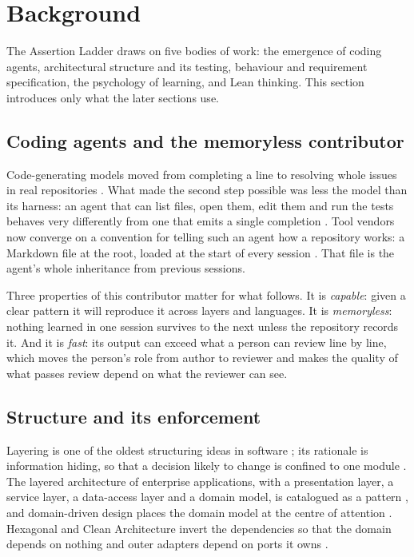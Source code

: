 \section{Background}\label{sec:background}

The Assertion Ladder draws on five bodies of work: the emergence of coding agents, architectural
structure and its testing, behaviour and requirement specification, the psychology of learning,
and Lean thinking. This section introduces only what the later sections use.

\subsection{Coding agents and the memoryless contributor}

Code-generating models moved from completing a line \citep{chen2021codex} to resolving whole
issues in real repositories \citep{jimenez2024swebench}. What made the second step possible was
less the model than its harness: an agent that can list files, open them, edit them and run the
tests behaves very differently from one that emits a single completion
\citep{yang2024sweagent}. Tool vendors now converge on a convention for telling such an agent
how a repository works: a Markdown file at the root, loaded at the start of every session
\citep{agentsmd}. That file is the agent's whole inheritance from previous sessions.

Three properties of this contributor matter for what follows. It is \emph{capable}: given a
clear pattern it will reproduce it across layers and languages. It is \emph{memoryless}: nothing
learned in one session survives to the next unless the repository records it. And it is
\emph{fast}: its output can exceed what a person can review line by line, which moves the
person's role from author to reviewer \citep{barke2023grounded} and makes the quality of what
passes review depend on what the reviewer can see.

\subsection{Structure and its enforcement}

Layering is one of the oldest structuring ideas in software \citep{dijkstra1968the}; its
rationale is information hiding, so that a decision likely to change is confined to one module
\citep{parnas1972criteria}. The layered architecture of enterprise applications, with a
presentation layer, a service layer, a data-access layer and a domain model, is catalogued as a
pattern \citep{buschmann1996posa,fowler2002peaa}, and domain-driven design places the domain
model at the centre of attention \citep{evans2003ddd}. Hexagonal and Clean Architecture invert
the dependencies so that the domain depends on nothing and outer adapters depend on ports it
owns \citep{cockburn2005hexagonal,martin2017clean}.

